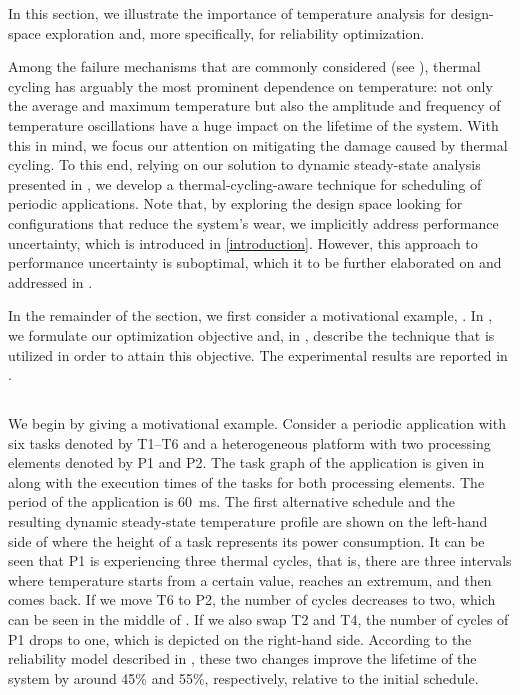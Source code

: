 In this section, we illustrate the importance of temperature analysis for
design-space exploration and, more specifically, for reliability optimization.

Among the failure mechanisms that are commonly considered (see
), thermal cycling has arguably the most prominent
dependence on temperature: not only the average and maximum temperature but also
the amplitude and frequency of temperature oscillations have a huge impact on
the lifetime of the system. With this in mind, we focus our attention on
mitigating the damage caused by thermal cycling. To this end, relying on our
solution to dynamic steady-state analysis presented in
, we develop a thermal-cycling-aware
technique for scheduling of periodic applications. Note that, by exploring the
design space looking for configurations that reduce the system's wear, we
implicitly address performance uncertainty, which is introduced in
\cref{introduction}. However, this approach to performance uncertainty is
suboptimal, which it to be further elaborated on and addressed in
.

In the remainder of the section, we first consider a motivational example,
. In , we
formulate our optimization objective and, in ,
describe the technique that is utilized in order to attain this objective. The
experimental results are reported in .

\subsection{\motivationtitle}

We begin by giving a motivational example. Consider a periodic application with
six tasks denoted by T1--T6 and a heterogeneous platform with two processing
elements denoted by P1 and P2. The task graph of the application is given in
 along with the execution times of the tasks
for both processing elements. The period of the application is 60~ms. The first
alternative schedule and the resulting dynamic steady-state temperature profile
are shown on the left-hand side of  where the
height of a task represents its power consumption. It can be seen that P1 is
experiencing three thermal cycles, that is, there are three intervals where
temperature starts from a certain value, reaches an extremum, and then comes
back. If we move T6 to P2, the number of cycles decreases to two, which can be
seen in the middle of . If we also swap T2 and T4,
the number of cycles of P1 drops to one, which is depicted on the right-hand
side. According to the reliability model described in
, these two changes improve the lifetime of the
system by around 45\% and 55\%, respectively, relative to the initial schedule.

